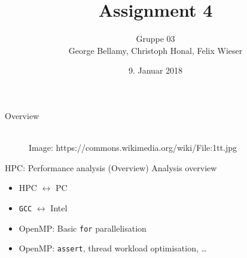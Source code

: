\documentclass[shortpres,usenames,dvipsnames]{beamer}
\title[{Tsunami simulation}]{Assignment 4}
\author[Bellamy, Honal, Wieser]{Gruppe 03\\George Bellamy, Christoph Honal, Felix Wieser\\\vspace{10pt}{\small Bachelorpraktikum}}
\institute[TU M\"unchen]{Technical University of Munich}
\date{9. Januar 2018}
\begin{document}
\maketitle

\begin{frame}{Overview}
	\begin{figure}
		\hspace{20pt}
		\hspace{40pt}\vspace{10pt}\\
		\vfill
		\flushleft
		{\fontsize{5}{5} \selectfont *Image: https://commons.wikimedia.org/wiki/File:1tt.jpg}
	\end{figure}
\end{frame}

\begin{frame}[fragile]{HPC: Performance analysis (Overview)}
	Analysis overview
	\begin{itemize}
		\item HPC $\leftrightarrow$ PC
		\item \verb|GCC| $\leftrightarrow$ Intel
		\item OpenMP: Basic \verb|for| parallelisation
		\item OpenMP: \verb|assert|, thread workload optimisation, \dots
	\end{itemize}
\end{frame}
\end{document}
